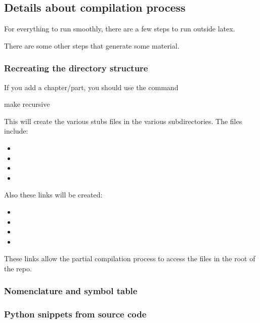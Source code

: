\subsection{Details about compilation process}

For everything to run smoothly, there are a few steps to run outside latex.

There are some other steps that generate some material.

\subsubsection{Recreating the directory structure}

If you add a chapter/part, you should use the command

\begin{console}
  make recursive
\end{console}

This will create the various stubs files in the various subdirectories.
The files include:
\begin{itemize}
  \item {}
  \item {}
  \item {}
  \item {}
\end{itemize}
Also these links will be created:
\begin{itemize}
  \item {}
  \item {}
  \item {}
  \item {}
\end{itemize}
These links allow the partial compilation process to access the files in the root of the repo.

\subsubsection{Nomenclature and symbol table}


\subsubsection{Python snippets from source code}

